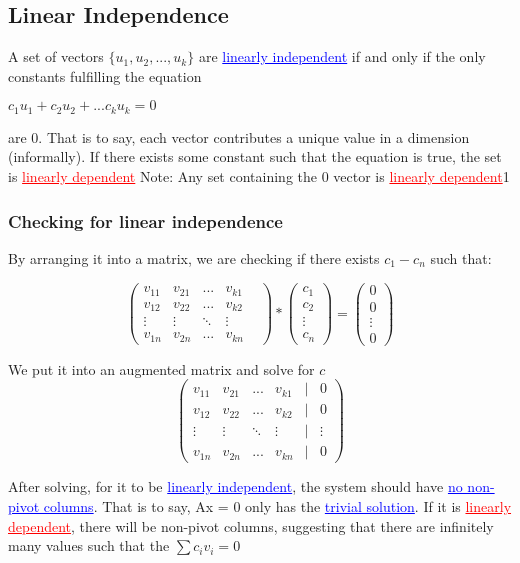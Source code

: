 \documentclass{article}
\newcommand{\bul}[1]{\textcolor{blue}{\underline{#1}}}
\newcommand{\rul}[1]{\textcolor{red}{\underline{#1}}}
\begin{document}
\subsection{Linear Independence}
A set of vectors $\{u_1, u_2, ..., u_k\}$ are \bul{linearly independent} if and only if the only constants fulfilling the equation
\begin{center}
    $c_1u_1 + c_2u_2 + ... c_ku_k = 0$
\end{center}
are 0. That is to say, each vector contributes a unique value in a dimension (informally). If there exists some constant such that the equation is true, the set is \rul{linearly dependent}
Note: Any set containing the 0 vector is \rul{linearly dependent}1
\subsubsection{Checking for linear independence}
By arranging it into a matrix, we are checking if there exists $c_1 - c_n$ such that:

\[
\begin{pmatrix}
v_{11} & v_{21} & ... & v_{k1} & \\
v_{12} & v_{22} & ... & v_{k2} & \\
\vdots & \vdots & \ddots & \vdots\\
v_{1n} & v_{2n} & ... & v_{kn} &
\end{pmatrix} *
\begin{pmatrix}
    c_1\\
    c_2\\
    \vdots\\
    c_n
\end{pmatrix} = 
\begin{pmatrix}
    0\\
    0\\
    \vdots\\
    0
\end{pmatrix}
\]

We put it into an augmented matrix and solve for $c$
\[
\begin{pmatrix}
v_{11} & v_{21} & ... & v_{k1} & | & 0\\
v_{12} & v_{22} & ... & v_{k2} & | & 0 \\
\vdots & \vdots & \ddots & \vdots & | & \vdots\\
v_{1n} & v_{2n} & ... & v_{kn} & | & 0
\end{pmatrix}
\]

After solving, for it to be \bul{linearly independent}, the system should have \bul{no non-pivot columns}. That is to say, Ax = 0 only has the \bul{trivial solution}. If it is \rul{linearly dependent}, there will be non-pivot columns, suggesting that there are infinitely many values such that the $\sum c_iv_i = 0$
\end{document}
